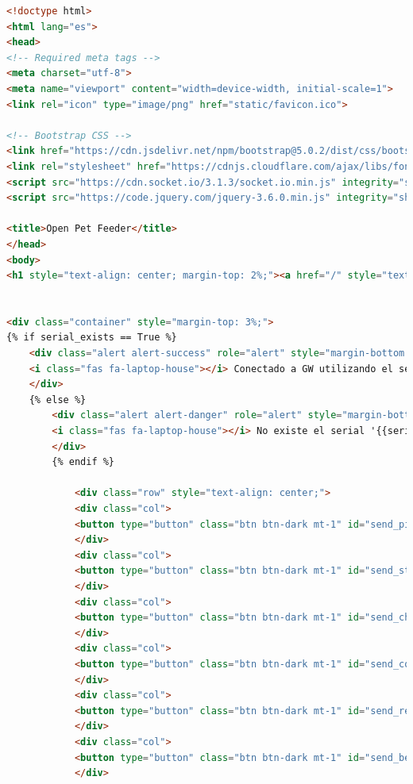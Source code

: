 \documentclass[12pt]{article}
\begin{document}
	\begin{lstlisting}[language=html]
<!doctype html>
<html lang="es">
<head>
<!-- Required meta tags -->
<meta charset="utf-8">
<meta name="viewport" content="width=device-width, initial-scale=1">
<link rel="icon" type="image/png" href="static/favicon.ico">

<!-- Bootstrap CSS -->
<link href="https://cdn.jsdelivr.net/npm/bootstrap@5.0.2/dist/css/bootstrap.min.css" rel="stylesheet" integrity="sha384-EVSTQN3/azprG1Anm3QDgpJLIm9Nao0Yz1ztcQTwFspd3yD65VohhpuuCOmLASjC" crossorigin="anonymous">
<link rel="stylesheet" href="https://cdnjs.cloudflare.com/ajax/libs/font-awesome/5.15.3/css/all.min.css" integrity="sha512-iBBXm8fW90+nuLcSKlbmrPcLa0OT92xO1BIsZ+ywDWZCvqsWgccV3gFoRBv0z+8dLJgyAHIhR35VZc2oM/gI1w==" crossorigin="anonymous" referrerpolicy="no-referrer" />
<script src="https://cdn.socket.io/3.1.3/socket.io.min.js" integrity="sha384-cPwlPLvBTa3sKAgddT6krw0cJat7egBga3DJepJyrLl4Q9/5WLra3rrnMcyTyOnh" crossorigin="anonymous"></script>
<script src="https://code.jquery.com/jquery-3.6.0.min.js" integrity="sha256-/xUj+3OJU5yExlq6GSYGSHk7tPXikynS7ogEvDej/m4=" crossorigin="anonymous"></script>

<title>Open Pet Feeder</title>
</head>
<body>
<h1 style="text-align: center; margin-top: 2%;"><a href="/" style="text-decoration: none; color: inherit;"><i class="fas fa-paw"></i> Open Pet Feeder</a></h1>


<div class="container" style="margin-top: 3%;">
{% if serial_exists == True %}
	<div class="alert alert-success" role="alert" style="margin-bottom: 3%;">
	<i class="fas fa-laptop-house"></i> Conectado a GW utilizando el serial: {{serial_port}}!
	</div>
	{% else %}
		<div class="alert alert-danger" role="alert" style="margin-bottom: 3%;">
		<i class="fas fa-laptop-house"></i> No existe el serial '{{serial_port}}'. Configura el serial y reinicia el programa.
		</div>
		{% endif %}
			
			<div class="row" style="text-align: center;">
			<div class="col">
			<button type="button" class="btn btn-dark mt-1" id="send_ping" value="ping"><i class="fas fa-comments"></i>  Comprobar actividad</button>
			</div>
			<div class="col">
			<button type="button" class="btn btn-dark mt-1" id="send_status" value="status"><i class="fas fa-clipboard-list"></i>  Comprobar estado</button>
			</div>
			<div class="col">
			<button type="button" class="btn btn-dark mt-1" id="send_check_levels" value="check_levels"> <i class="far fa-check-circle"></i>  Comprobar niveles</button>
			</div>
			<div class="col">
			<button type="button" class="btn btn-dark mt-1" id="send_comedero" value="rellenar_comedero"><i class="fas fa-utensils"></i> Rellenar comedero</button>
			</div>
			<div class="col">
			<button type="button" class="btn btn-dark mt-1" id="send_reset_comedero" value="reset_comedero"><i class="fas fa-eraser"></i> Reiniciar comedero</button>
			</div>
			<div class="col">
			<button type="button" class="btn btn-dark mt-1" id="send_bebedero" value="rellenar_bebedero"><i class="fas fa-faucet"></i> Rellenar bebedero</button>
			</div>
			

\end{lstlisting}
\end{document}
